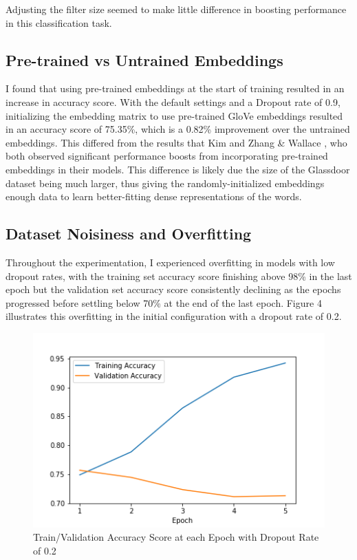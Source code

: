 \documentclass[11pt,a4paper]{article}
\begin{document}
	Adjusting the filter size seemed to make little difference in boosting performance in this classification task.
	
	
	\subsection{Pre-trained vs Untrained Embeddings}
	I found that using pre-trained embeddings at the start of training resulted in an increase in accuracy score. With the default settings and a Dropout rate of 0.9, initializing the embedding matrix to use pre-trained GloVe embeddings resulted in an accuracy score of 75.35\%, which is a 0.82\% improvement over the untrained embeddings. This differed from the results that Kim \cite{Kim} and Zhang \& Wallace \cite{Zhang}, who both observed significant performance boosts from incorporating pre-trained embeddings in their models. This difference is likely due the size of the Glassdoor dataset being much larger, thus giving the randomly-initialized embeddings enough data to learn better-fitting dense representations of the words. 
	
	
	\subsection{Dataset Noisiness and Overfitting}
	Throughout the experimentation, I experienced overfitting in models with low dropout rates, with the training set accuracy score finishing above 98\% in the last epoch but the validation set accuracy score consistently declining as the epochs progressed before settling below 70\% at the end of the last epoch. Figure 4 illustrates this overfitting in the initial configuration with a dropout rate of 0.2.
	
	\begin{figure}[h]
	\begin{center}
		\includegraphics[scale=0.5]{overfitting}
		\caption[scale=0.75]{Train/Validation Accuracy Score at each Epoch with Dropout Rate of 0.2}
	\end{center}
	\end{figure}
\end{document}
